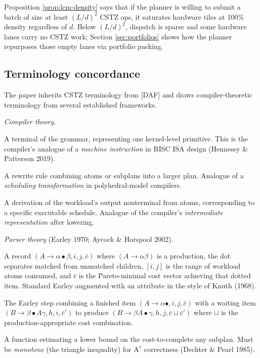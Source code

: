 \begin{remark}
  \label{rem:coarseness}
  Proposition \ref{prop:lcm-density} says that if the
  planner is willing to submit a batch of size at
  least $(L/d)^2$ CSTZ ops, it saturates hardware
  tiles at 100\% density regardless of $d$. Below
  $(L/d)^2$, dispatch is sparse and some hardware
  lanes carry no CSTZ work; Section \ref{sec:portfolios}
  shows how the planner repurposes those empty lanes
  via portfolio packing.
\end{remark}

\subsection{Terminology concordance}
\label{sec:concordance}

The paper inherits CSTZ terminology from [DAF] and
draws compiler-theoretic terminology from several
established frameworks.

\emph{Compiler theory.}
\begin{description}[nosep,leftmargin=1.5cm]
  \item[Atom] A terminal of the grammar, representing
    one kernel-level primitive. This is the compiler's
    analogue of a \emph{machine instruction} in
    RISC ISA design (Hennessy \& Patterson 2019).
  \item[Production] A rewrite rule combining atoms or
    subplans into a larger plan. Analogue of a
    \emph{scheduling transformation} in
    polyhedral-model compilers.
  \item[Plan] A derivation of the workload's output
    nonterminal from atoms, corresponding to a
    specific executable schedule. Analogue of the
    compiler's \emph{intermediate representation}
    after lowering.
\end{description}

\emph{Parser theory} (Earley 1970; Aycock \& Horspool 2002).
\begin{description}[nosep,leftmargin=1.5cm]
  \item[Chart item] A record $(A \to \alpha \bullet
    \beta, i, j, \bar{c})$ where $(A \to \alpha \beta)$
    is a production, the dot separates matched from
    unmatched children, $[i, j]$ is the range of
    workload atoms consumed, and $\bar{c}$ is the
    Pareto-minimal cost vector achieving that dotted
    item. Standard Earley augmented with an attribute
    in the style of Knuth (1968).
  \item[Completer] The Earley step combining a
    finished item $(A \to \alpha \bullet, i, j, \bar{c})$
    with a waiting item $(B \to \beta \bullet A \gamma,
    h, i, \bar{c}')$ to produce
    $(B \to \beta A \bullet \gamma, h, j, \bar{c}
    \sqcup \bar{c}')$ where $\sqcup$ is the
    production-appropriate cost combination.
  \item[Admissible heuristic] A function estimating a
    lower bound on the cost-to-complete any subplan.
    Must be \emph{monotone} (the triangle inequality)
    for A$^*$ correctness (Dechter \& Pearl 1985).
\end{description}

